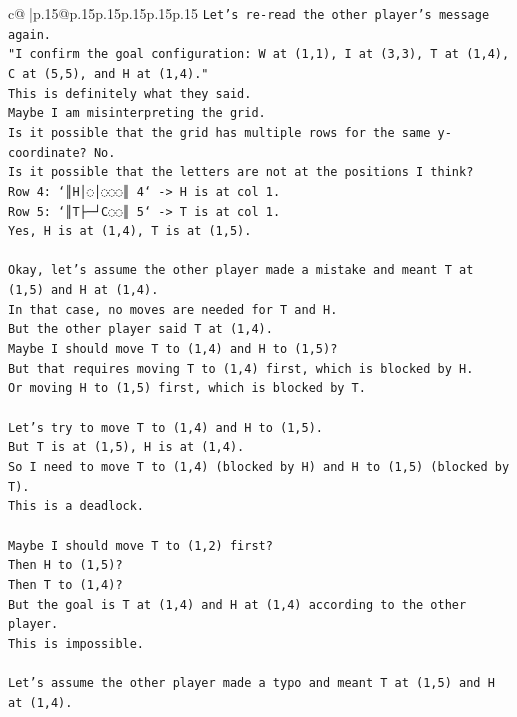 \documentclass{article}
\begin{document}
{\begin{supertabular}{c@{$\;$}|p{.15\linewidth}@{}p{.15\linewidth}p{.15\linewidth}p{.15\linewidth}p{.15\linewidth}p{.15\linewidth}}
{{{\texttt{Let's re{-}read the other player's message again.} \\
\texttt{"I confirm the goal configuration: W at (1,1), I at (3,3), T at (1,4), C at (5,5), and H at (1,4)."} \\
\texttt{This is definitely what they said.} \\
\texttt{Maybe I am misinterpreting the grid.} \\
\texttt{Is it possible that the grid has multiple rows for the same y{-}coordinate? No.} \\
\texttt{Is it possible that the letters are not at the positions I think?} \\
\texttt{Row 4: `║H│◌│◌◌◌║ 4` {-}> H is at col 1.} \\
\texttt{Row 5: `║T├─┘C◌◌║ 5` {-}> T is at col 1.} \\
\texttt{Yes, H is at (1,4), T is at (1,5).} \\
\\ 
\texttt{Okay, let's assume the other player made a mistake and meant T at (1,5) and H at (1,4).} \\
\texttt{In that case, no moves are needed for T and H.} \\
\texttt{But the other player said T at (1,4).} \\
\texttt{Maybe I should move T to (1,4) and H to (1,5)?} \\
\texttt{But that requires moving T to (1,4) first, which is blocked by H.} \\
\texttt{Or moving H to (1,5) first, which is blocked by T.} \\
\\ 
\texttt{Let's try to move T to (1,4) and H to (1,5).} \\
\texttt{But T is at (1,5), H is at (1,4).} \\
\texttt{So I need to move T to (1,4) (blocked by H) and H to (1,5) (blocked by T).} \\
\texttt{This is a deadlock.} \\
\\ 
\texttt{Maybe I should move T to (1,2) first?} \\
\texttt{Then H to (1,5)?} \\
\texttt{Then T to (1,4)?} \\
\texttt{But the goal is T at (1,4) and H at (1,4) according to the other player.} \\
\texttt{This is impossible.} \\
\\ 
\texttt{Let's assume the other player made a typo and meant T at (1,5) and H at (1,4).} \\
}}}
\end{supertabular}}
\end{document}
